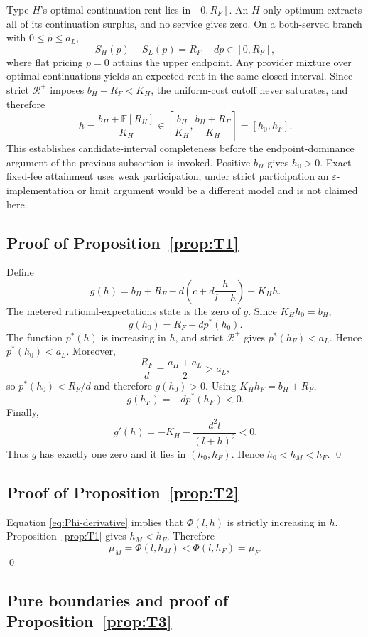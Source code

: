 Type $H$'s optimal continuation rent lies in $[0,R_F]$. An $H$-only optimum extracts all of its continuation surplus, and no service gives zero. On a both-served branch with $0\leq p\leq a_L$,
\[
 S_H(p)-S_L(p)=R_F-dp\in[0,R_F],
\]
where flat pricing $p=0$ attains the upper endpoint. Any provider mixture over optimal continuations yields an expected rent in the same closed interval. Since strict $\mathcal R^+$ imposes $b_H+R_F<K_H$, the uniform-cost cutoff never saturates, and therefore
\[
 h=\frac{b_H+\mathbb E[R_H]}{K_H}\in
 \left[\frac{b_H}{K_H},\frac{b_H+R_F}{K_H}\right]
 =[h_0,h_F].
\]
This establishes candidate-interval completeness before the endpoint-dominance argument of the previous subsection is invoked. Positive $b_H$ gives $h_0>0$. Exact fixed-fee attainment uses weak participation; under strict participation an $\varepsilon$-implementation or limit argument would be a different model and is not claimed here.

\subsection{Proof of Proposition~\ref{prop:T1}}

Define
\[
g(h)=b_H+R_F-d\left(c+d\frac{h}{l+h}\right)-K_Hh.
\]
The metered rational-expectations state is the zero of $g$. Since $K_Hh_0=b_H$,
\[
g(h_0)=R_F-dp^*(h_0).
\]
The function $p^*(h)$ is increasing in $h$, and strict $\mathcal R^+$ gives $p^*(h_F)<a_L$. Hence $p^*(h_0)<a_L$. Moreover,
\[
\frac{R_F}{d}=\frac{a_H+a_L}{2}>a_L,
\]
so $p^*(h_0)<R_F/d$ and therefore $g(h_0)>0$. Using $K_Hh_F=b_H+R_F$,
\[
g(h_F)=-d p^*(h_F)<0.
\]
Finally,
\[
g'(h)=-K_H-\frac{d^2l}{(l+h)^2}<0.
\]
Thus $g$ has exactly one zero and it lies in $(h_0,h_F)$. Hence $h_0<h_M<h_F$. \qed

\subsection{Proof of Proposition~\ref{prop:T2}}

Equation \eqref{eq:Phi-derivative} implies that $\Phi(l,h)$ is strictly increasing in $h$. Proposition~\ref{prop:T1} gives $h_M<h_F$. Therefore
\[
\mu_M=\Phi(l,h_M)<\Phi(l,h_F)=\mu_F.
\]
\qed

\subsection{Pure boundaries and proof of Proposition~\ref{prop:T3}}\label{app:mixed-proof}


